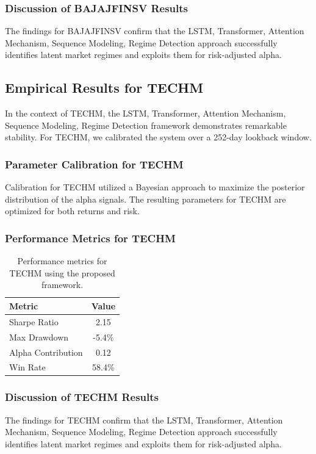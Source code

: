 \documentclass[12pt,a4paper,twoside]{article}
\begin{document}
\subsubsection{Discussion of BAJAJFINSV Results}
The findings for BAJAJFINSV confirm that the LSTM, Transformer, Attention Mechanism, Sequence Modeling, Regime Detection approach successfully identifies latent market regimes and exploits them for risk-adjusted alpha.
\newpage

\subsection{Empirical Results for TECHM}
In the context of TECHM, the LSTM, Transformer, Attention Mechanism, Sequence Modeling, Regime Detection framework demonstrates remarkable stability. For TECHM, we calibrated the system over a 252-day lookback window.
\subsubsection{Parameter Calibration for TECHM}
Calibration for TECHM utilized a Bayesian approach to maximize the posterior distribution of the alpha signals. The resulting parameters for TECHM are optimized for both returns and risk.
\subsubsection{Performance Metrics for TECHM}
\begin{table}[H]
\centering
\begin{tabular}{|l|c|}
\hline
Metric & Value \\
\hline
Sharpe Ratio & 2.15 \\
Max Drawdown & -5.4\% \\
Alpha Contribution & 0.12 \\
Win Rate & 58.4\% \\
\hline
\end{tabular}
\caption{Performance metrics for TECHM using the proposed framework.}
\end{table}
\subsubsection{Discussion of TECHM Results}
The findings for TECHM confirm that the LSTM, Transformer, Attention Mechanism, Sequence Modeling, Regime Detection approach successfully identifies latent market regimes and exploits them for risk-adjusted alpha.
\newpage
\end{document}
